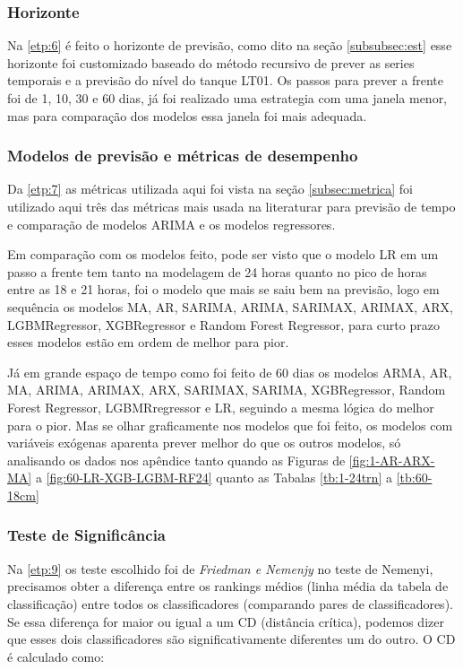 \subsubsection{Horizonte}

Na \ref{etp:6} é feito o horizonte de previsão, como dito na seção \ref{subsubsec:est} esse horizonte foi customizado baseado do método recursivo de prever as series temporais e a previsão do nível do tanque LT01. Os passos para prever a frente foi de 1, 10, 30 e 60 dias, já foi realizado uma estrategia com uma janela menor, mas para comparação dos modelos essa janela foi mais adequada.

\subsubsection{Modelos de previs\~ao e m\'etricas de desempenho}\label{subsubsec:modelos}

Da \ref{etp:7} as métricas utilizada aqui foi vista na seção \ref{subsec:metrica} foi utilizado aqui três das métricas mais usada na literaturar para previsão de tempo e comparação de modelos ARIMA e os modelos regressores.

    Em comparação com os modelos feito, pode ser visto que o modelo LR em um passo a frente tem tanto na modelagem de 24 horas quanto no pico de horas entre as 18 e 21 horas, foi o modelo que mais se saiu bem na previsão, logo em sequência os modelos MA, AR, SARIMA, ARIMA, SARIMAX, ARIMAX, ARX, LGBMRegressor, XGBRegressor e Random Forest Regressor, para curto prazo esses modelos estão em ordem de melhor para pior.
    
    Já em grande espaço de tempo como foi feito de 60 dias os modelos ARMA, AR, MA, ARIMA, ARIMAX, ARX, SARIMAX, SARIMA, XGBRegressor, Random Forest Regressor, LGBMRregressor e LR, seguindo a mesma lógica do melhor para o pior. Mas se olhar graficamente nos modelos que foi feito, os modelos com variáveis exógenas aparenta prever melhor do que os outros modelos, só analisando os dados nos apêndice tanto quando as Figuras de \ref{fig:1-AR-ARX-MA} a \ref{fig:60-LR-XGB-LGBM-RF24} quanto as Tabalas \ref{tb:1-24trn} a \ref{tb:60-18cm}   
    
    \subsubsection{Teste de Signific\^ancia}
    
    Na \ref{etp:9} os teste escolhido foi de \textit{Friedman e Nemenjy} no teste de Nemenyi, precisamos obter a diferença entre os rankings médios (linha média da tabela de classificação) entre todos os classificadores (comparando pares de classificadores). Se essa diferença for maior ou igual a um CD (distância crítica), podemos dizer que esses dois classificadores são significativamente diferentes um do outro. O CD é calculado como:
    
